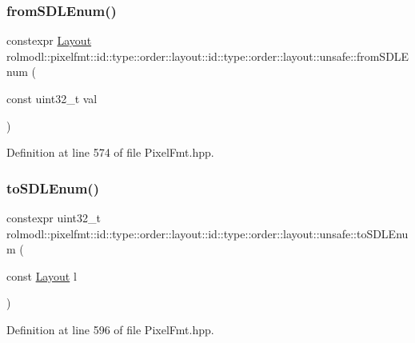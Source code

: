 \subsubsection{\texorpdfstring{fromSDLEnum()}{fromSDLEnum()}}
{\footnotesize\ttfamily constexpr \mbox{\hyperlink{namespacerolmodl_1_1pixelfmt_1_1id_1_1type_1_1order_a4177275b82f1923d1a2f07e1f87f0391}{Layout}} rolmodl\+::pixelfmt\+::id\+::type\+::order\+::layout\+::id\+::type\+::order\+::layout\+::unsafe\+::from\+S\+D\+L\+Enum (\begin{DoxyParamCaption}\item[{const uint32\+\_\+t}]{val }\end{DoxyParamCaption})\hspace{0.3cm}{\ttfamily [noexcept]}}



Definition at line 574 of file Pixel\+Fmt.\+hpp.

\mbox{\label{namespacerolmodl_1_1pixelfmt_1_1id_1_1type_1_1order_1_1layout_1_1id_1_1type_1_1order_1_1layout_1_1unsafe_ad06b3d3abf871aec4ce7aec17a55a516}} 
\subsubsection{\texorpdfstring{toSDLEnum()}{toSDLEnum()}}
{\footnotesize\ttfamily constexpr uint32\+\_\+t rolmodl\+::pixelfmt\+::id\+::type\+::order\+::layout\+::id\+::type\+::order\+::layout\+::unsafe\+::to\+S\+D\+L\+Enum (\begin{DoxyParamCaption}\item[{const \mbox{\hyperlink{namespacerolmodl_1_1pixelfmt_1_1id_1_1type_1_1order_a4177275b82f1923d1a2f07e1f87f0391}{Layout}}}]{l }\end{DoxyParamCaption})\hspace{0.3cm}{\ttfamily [noexcept]}}



Definition at line 596 of file Pixel\+Fmt.\+hpp.

